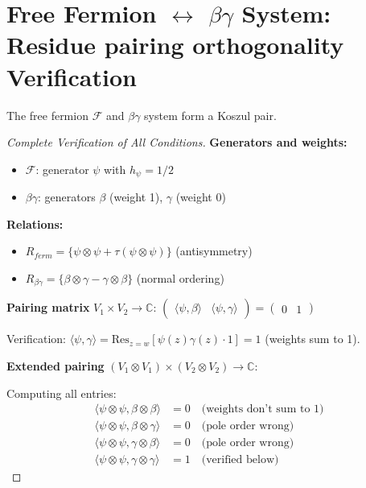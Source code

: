 \section{Free Fermion $\leftrightarrow$ $\beta\gamma$ System: Residue pairing orthogonality Verification}

\begin{theorem}
The free fermion $\mathcal{F}$ and $\beta\gamma$ system form a Koszul pair.
\end{theorem}

\begin{proof}[Complete Verification of All Conditions]
\textbf{Generators and weights:}
\begin{itemize}
\item $\mathcal{F}$: generator $\psi$ with $h_\psi = 1/2$
\item $\beta\gamma$: generators $\beta$ (weight 1), $\gamma$ (weight 0)
\end{itemize}

\textbf{Relations:}
\begin{itemize}
\item $R_{ferm} = \{\psi \otimes \psi + \tau(\psi \otimes \psi)\}$ (antisymmetry)
\item $R_{\beta\gamma} = \{\beta \otimes \gamma - \gamma \otimes \beta\}$ (normal ordering)
\end{itemize}

\textbf{Pairing matrix} $V_1 \times V_2 \to \mathbb{C}$:
$\begin{pmatrix}
\langle\psi, \beta\rangle & \langle\psi, \gamma\rangle
\end{pmatrix} = \begin{pmatrix}
0 & 1
\end{pmatrix}$

Verification: $\langle\psi, \gamma\rangle = \text{Res}_{z=w}[\psi(z)\gamma(z) \cdot 1] = 1$ (weights sum to 1).

\textbf{Extended pairing} $(V_1 \otimes V_1) \times (V_2 \otimes V_2) \to \mathbb{C}$:

Computing all entries:
\begin{align}
\langle\psi \otimes \psi, \beta \otimes \beta\rangle &= 0 \quad \text{(weights don't sum to 1)}\\
\langle\psi \otimes \psi, \beta \otimes \gamma\rangle &= 0 \quad \text{(pole order wrong)}\\
\langle\psi \otimes \psi, \gamma \otimes \beta\rangle &= 0 \quad \text{(pole order wrong)}\\
\langle\psi \otimes \psi, \gamma \otimes \gamma\rangle &= 1 \quad \text{(verified below)}
\end{align}


\end{proof}
